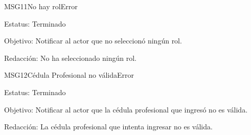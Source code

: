 \begin{mensaje}{MSG11}{No hay rol}{Error}
	\item[Estatus:] Terminado
	\item[Objetivo:] Notificar al actor que no seleccionó ningún rol.
	\item[Redacción:] No ha seleccionado ningún rol.
\end{mensaje}

\begin{mensaje}{MSG12}{Cédula Profesional no válida}{Error}
	\item[Estatus:] Terminado
	\item[Objetivo:] Notificar al actor que la cédula profesional que ingresó no es válida.
	\item[Redacción:] La cédula profesional que intenta ingresar no es válida.
\end{mensaje}

